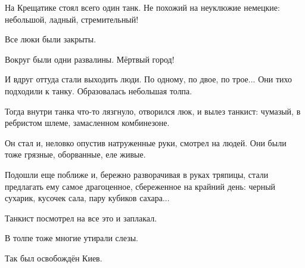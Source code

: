На Крещатике стоял всего один танк. Не похожий на неуклюжие немецкие:
небольшой, ладный, стремительный!

Все люки были закрыты.

Вокруг были одни развалины. Мёртвый город!

И вдруг оттуда стали выходить люди. По одному, по двое, по трое... Они тихо
подходили к танку. Образовалась небольшая толпа.

Тогда внутри танка что-то лязгнуло, отворился люк, и вылез танкист: чумазый, в
ребристом шлеме, замасленном комбинезоне.

Он стал и, неловко опустив натруженные руки, смотрел на людей. Они были тоже
грязные, оборванные, еле живые.

Подошли еще поближе и, бережно разворачивая в руках тряпицы, стали предлагать
ему самое драгоценное, сбереженное на крайний день: черный сухарик, кусочек
сала, пару кубиков сахара...

Танкист посмотрел на все это и заплакал.

В толпе тоже многие утирали слезы.

Так был освобождён Киев.
